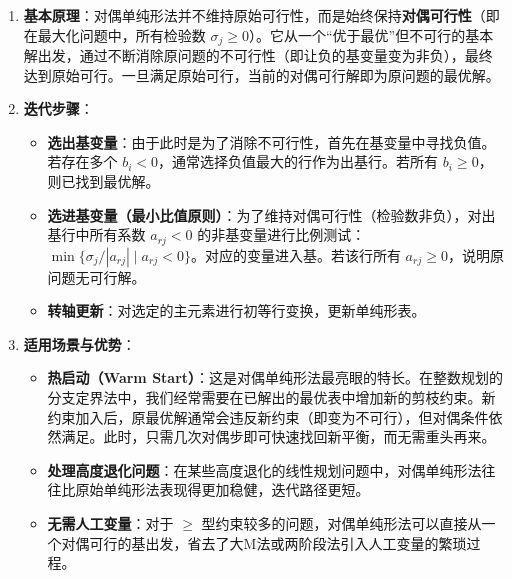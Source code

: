 \documentclass[12pt]{article}
\theoremstyle{plain}
\theoremstyle{definition}
\begin{document}
\begin{enumerate}
    \item \textbf{基本原理}：对偶单纯形法并不维持原始可行性，而是始终保持\textbf{对偶可行性}（即在最大化问题中，所有检验数 $\sigma_j \geq 0$）。它从一个“优于最优”但不可行的基本解出发，通过不断消除原问题的不可行性（即让负的基变量变为非负），最终达到原始可行。一旦满足原始可行，当前的对偶可行解即为原问题的最优解。
    
    \item \textbf{迭代步骤}：
    \begin{itemize}
        \item \textbf{选出基变量}：由于此时是为了消除不可行性，首先在基变量中寻找负值。若存在多个 $b_i < 0$，通常选择负值最大的行作为出基行。若所有 $b_i \geq 0$，则已找到最优解。
        \item \textbf{选进基变量（最小比值原则）}：为了维持对偶可行性（检验数非负），对出基行中所有系数 $a_{rj} < 0$ 的非基变量进行比例测试：$\min \{ \sigma_j / |a_{rj}| \mid a_{rj} < 0 \}$。对应的变量进入基。若该行所有 $a_{rj} \geq 0$，说明原问题无可行解。
        \item \textbf{转轴更新}：对选定的主元素进行初等行变换，更新单纯形表。
    \end{itemize}

    \item \textbf{适用场景与优势}：
    \begin{itemize}
        \item \textbf{热启动（Warm Start）}：这是对偶单纯形法最亮眼的特长。在整数规划的分支定界法中，我们经常需要在已解出的最优表中增加新的剪枝约束。新约束加入后，原最优解通常会违反新约束（即变为不可行），但对偶条件依然满足。此时，只需几次对偶步即可快速找回新平衡，而无需重头再来。
        \item \textbf{处理高度退化问题}：在某些高度退化的线性规划问题中，对偶单纯形法往往比原始单纯形法表现得更加稳健，迭代路径更短。
        \item \textbf{无需人工变量}：对于 $\geq$ 型约束较多的问题，对偶单纯形法可以直接从一个对偶可行的基出发，省去了大M法或两阶段法引入人工变量的繁琐过程。
    \end{itemize}
\end{enumerate}
\end{document}
